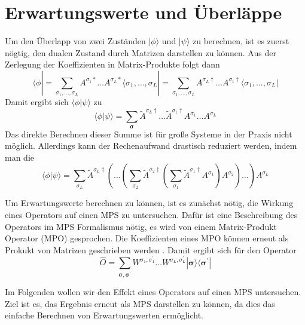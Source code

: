 \documentclass[10pt,a4paper]{report}
\newcommand{\SumIndex}{\sigma_1,\ldots,\sigma_L}
\begin{document}
\section{Erwartungswerte und Überläppe}\label{MPO}
Um den Überlapp von zwei Zuständen $|\phi\rangle$ und $|\psi\rangle$ zu berechnen, ist es zuerst nögtig, den dualen Zustand durch Matrizen darstellen zu können. Aus der Zerlegung der Koeffizienten in Matrix-Produkte folgt dann
\begin{equation}
\langle\phi|=\sum_{\SumIndex} A^{\sigma_1\ast}\ldots A^{\sigma_L \ast}\langle\SumIndex| = \sum_{\SumIndex}A^{\sigma_L\dagger}\ldots A^{\sigma_1 \dagger}\langle\SumIndex|
\end{equation}
Damit ergibt sich $\langle\phi|\psi\rangle$ zu 
\begin{equation}
\langle\phi|\psi\rangle=\sum_{\bm{\sigma}}\tilde{A}^{\sigma_L \dagger}\ldots\tilde{A}^{\sigma_1 \dagger} A^{\sigma_1}\ldots A^{\sigma_L} 
\end{equation}
Das direkte Berechnen dieser Summe ist für große Systeme in der Praxis nicht möglich. Allerdings kann der Rechenaufwand drastisch reduziert werden, indem man die 
\begin{equation}
\langle\phi|\psi\rangle=\sum_{\sigma_L}\tilde{A}^{\sigma_L\dagger}(\ldots(\sum_{\sigma_2}\tilde{A}^{\sigma_2\dagger}(\sum_{\sigma_1}\tilde{A}^{\sigma_1\dagger}A^{\sigma_1})A^{\sigma_2})\ldots)A^{\sigma_L}
\end{equation}

Um Erwartungswerte berechnen zu können, ist es zunächst nötig, die Wirkung eines Operators auf einen MPS zu untersuchen. Dafür ist eine Beschreibung des Operators im MPS Formalismus nötig, es wird von einem Matrix-Produkt Operator (MPO) gesprochen. Die Koeffizienten eines MPO können erneut als Prokukt von Matrizen geschrieben werden . Damit ergibt sich für den Operator
\begin{equation}
\hat{O}=\sum_{\bm{\sigma},\bm{\sigma^\prime}}W^{\sigma_1,\sigma_1^\prime}\ldots W^{\sigma_L,\sigma_L^\prime} |\bm{\sigma}\rangle\langle\bm{\sigma^\prime}|
\end{equation}

Im Folgenden wollen wir den Effekt eines Operators auf einen MPS untersuchen. Ziel ist es, das Ergebnis erneut als MPS darstellen zu können, da dies das einfache Berechnen von Erwartungswerten ermöglicht.
\end{document}
